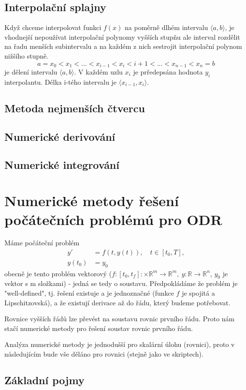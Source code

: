 \documentclass[a4]{report}
\newcommand{\R}{\mathbb{R}}
\theoremstyle{definition}
\begin{document}
{\subsection{Interpolační splajny}
Když chceme interpolovat funkci $f(x)$ na poměrně dlhém intervalu $\langle a,b \rangle$, je vhodnejší nepoužívat interpolační polynomy vyšších stupňu ale interval rozdělit na řadu menších subintervalu a na každém z nich sestrojit interpolační polynom nižšího stupně. 
$$a=x_0 < x_1 < ... < x_{i-1} < x_{i} < {i+1} <...< x_{n-1} < x_n=b$$ je dělení intervalu $\langle a,b \rangle$. V každém uzlu $x_i$ je prředepsána hodnota $y_i$ interpolantu. Délka i-tého intervalu je $\langle x_{i-1},x_i \rangle$.
\subsection{Metoda nejmenších čtvercu}
\subsection{Numerické derivování}
\subsection{Numerické integrování}


\section{Numerické metody řešení počátečních problémú pro ODR}
Máme počáteční problém
\begin{align}
y'&=f(t,y(t)), \quad t \in [t_{0}, T], \\
y(t_{0})&=y_{0}
\end{align}
obecně je tento problém vektorový ($f:[t_{0},t_{f}]:\times\R ^{m} \rightarrow \R^{m}, \: y:\R \rightarrow \R ^{n}$, $y_{0}$ je vektor s m složkami) - jedná se tedy o soustavu.  Předpokládáme že problém je "well-defined", tj. řešení existuje a je jednoznačné (funkce $f$ je spojitá a  Lipschitzovská), a že existují derivace až do řádu, který budeme potřebovat. 

Rovnice vyšších řádů lze převést na soustavu rovnic prvního řádu. Proto nám stačí numerické metody pro řešení soustav rovnic prvního řádu.  

Analýza numerické metody je jednodušší pro skalární úlohu (rovnici), proto v následujícím bude vše děláno pro rovnici (stejně jako ve skriptech). 
\subsection{Základní pojmy}
}
\end{document}
